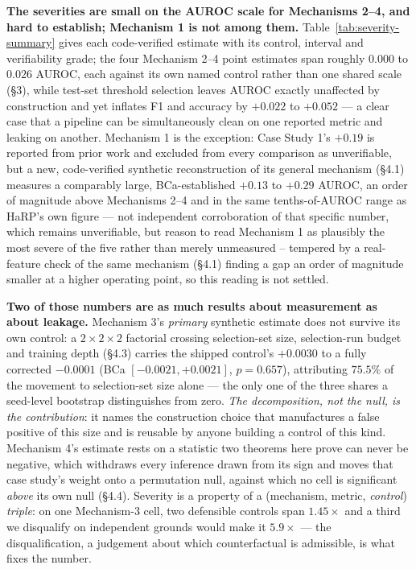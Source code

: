 \documentclass[10pt]{article} %
\begin{document}
\textbf{The severities are small on the AUROC scale for Mechanisms 2--4, and
hard to establish; Mechanism 1 is not among them.} Table~\ref{tab:severity-summary}
gives each code-verified estimate with its control, interval and verifiability
grade; the four Mechanism 2--4 point estimates span roughly $0.000$ to
$0.026$ AUROC, each against its own named control rather than one shared
scale (§3), while test-set threshold selection leaves AUROC exactly
unaffected by construction and yet inflates F1 and accuracy by $+0.022$ to
$+0.052$ --- a clear case that a pipeline can be simultaneously clean on one
reported metric and leaking on another. Mechanism 1 is the exception: Case
Study 1's $+0.19$ is reported from prior work and excluded from every
comparison as unverifiable, but a new, code-verified synthetic reconstruction
of its general mechanism (§4.1) measures a comparably large,
BCa-established $+0.13$ to $+0.29$ AUROC, an order of magnitude above
Mechanisms 2--4 and in the same tenths-of-AUROC range as HaRP's own figure
--- not independent corroboration of that specific number, which remains
unverifiable, but reason to read Mechanism 1 as plausibly the most severe of
the five rather than merely unmeasured -- tempered by a real-feature check
of the same mechanism (§4.1) finding a gap an order of magnitude smaller at
a higher operating point, so this reading is not settled.

\textbf{Two of those numbers are as much results about measurement as about
leakage.} Mechanism 3's \emph{primary} synthetic estimate does not survive its
own control: a $2\times2\times2$ factorial crossing selection-set size,
selection-run budget and training depth (§4.3) carries the shipped control's
$+0.0030$ to a fully corrected $-0.0001$ (BCa $[-0.0021,+0.0021]$, $p=0.657$),
attributing $75.5\%$ of the movement to selection-set size alone --- the only
one of the three shares a seed-level bootstrap distinguishes from zero.
\emph{The decomposition, not the null, is the contribution}: it names the
construction choice that manufactures a false positive of this size and is
reusable by anyone building a control of this kind. Mechanism 4's estimate
rests on a statistic two theorems here prove can never be negative, which
withdraws every inference drawn from its sign and moves that case study's
weight onto a permutation null, against which no cell is significant
\emph{above} its own null (§4.4). Severity is a property of a (mechanism,
metric, \emph{control}) \emph{triple}: on one Mechanism-3 cell, two
defensible controls span $1.45\times$ and a third we disqualify on
independent grounds would make it $5.9\times$ --- the disqualification, a
judgement about which counterfactual is admissible, is what fixes the number.
\end{document}
